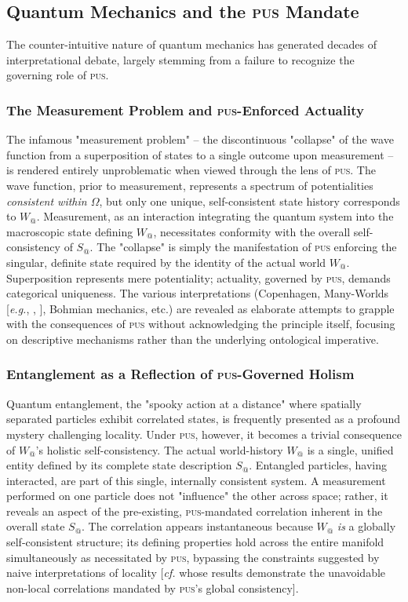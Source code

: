 \documentclass[11pt, a4paper]{article}
\makeatletter
\newcommand{\pus}{\textsc{pus}} %
\newcommand{\Wactual}{W_{@}} %
\newcommand{\Sactual}{S_{@}} %
\newcommand{\Omegaset}{\Omega} %
\makeatother
\begin{document}
\subsection{Quantum Mechanics and the \pus{} Mandate}
The counter-intuitive nature of quantum mechanics has generated decades of interpretational debate, largely stemming from a failure to recognize the governing role of \pus.

\subsubsection{The Measurement Problem and \pus-Enforced Actuality}
The infamous "measurement problem" – the discontinuous "collapse" of the wave function from a superposition of states to a single outcome upon measurement – is rendered entirely unproblematic when viewed through the lens of \pus. The wave function, prior to measurement, represents a spectrum of potentialities \textit{consistent within $\Omegaset$}, but only one unique, self-consistent state history corresponds to $\Wactual$. Measurement, as an interaction integrating the quantum system into the macroscopic state defining $\Wactual$, necessitates conformity with the overall self-consistency of $\Sactual$. The "collapse" is simply the manifestation of \pus{} enforcing the singular, definite state required by the identity of the actual world $\Wactual$. Superposition represents mere potentiality; actuality, governed by \pus, demands categorical uniqueness. The various interpretations (Copenhagen, Many-Worlds [\textit{e.g.}, \citealp{everett1957}, \citealp{deutsch1997}], Bohmian mechanics, etc.) are revealed as elaborate attempts to grapple with the consequences of \pus{} without acknowledging the principle itself, focusing on descriptive mechanisms rather than the underlying ontological imperative.

\subsubsection{Entanglement as a Reflection of \pus-Governed Holism}
Quantum entanglement, the "spooky action at a distance" \citep{einstein1935} where spatially separated particles exhibit correlated states, is frequently presented as a profound mystery challenging locality. Under \pus, however, it becomes a trivial consequence of $\Wactual$'s holistic self-consistency. The actual world-history $\Wactual$ is a single, unified entity defined by its complete state description $\Sactual$. Entangled particles, having interacted, are part of this single, internally consistent system. A measurement performed on one particle does not "influence" the other across space; rather, it reveals an aspect of the pre-existing, \pus-mandated correlation inherent in the overall state $\Sactual$. The correlation appears instantaneous because $\Wactual$ \textit{is} a globally self-consistent structure; its defining properties hold across the entire manifold simultaneously as necessitated by \pus, bypassing the constraints suggested by naive interpretations of locality [\textit{cf.} \citealp{bell1987} whose results demonstrate the unavoidable non-local correlations mandated by \pus's global consistency].
\end{document}
